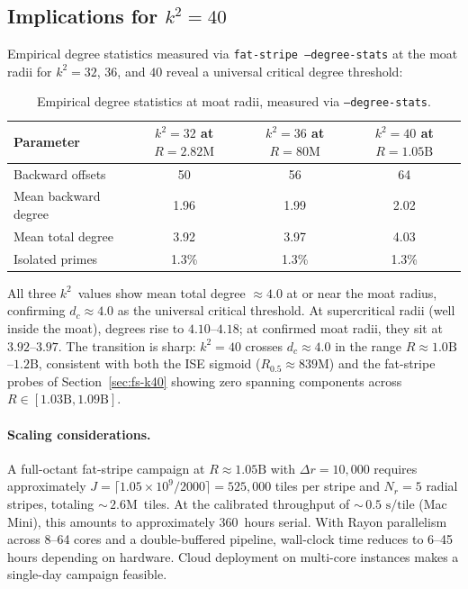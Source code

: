\documentclass[11pt,a4paper]{article}
\newcommand{\Rhalf}{R_{0.5}}
\theoremstyle{definition}
\theoremstyle{plain}
\theoremstyle{remark}
\begin{document}
\subsection{Implications for \texorpdfstring{$k^2 = 40$}{k\texttwosuperior\ = 40}}\label{sec:fs-k40-implications}

Empirical degree statistics measured via \texttt{fat-stripe --degree-stats} at the moat radii for $k^2 = 32$, $36$, and $40$ reveal a universal critical degree threshold:

\begin{table}[ht]
\centering
\begin{tabular}{@{}lccc@{}}
\toprule
Parameter & $k^2 = 32$ at $R = 2.82\text{M}$ & $k^2 = 36$ at $R = 80\text{M}$ & $k^2 = 40$ at $R = 1.05\text{B}$ \\
\midrule
Backward offsets            & 50   & 56   & 64   \\
Mean backward degree        & 1.96 & 1.99 & 2.02 \\
Mean total degree           & 3.92 & 3.97 & 4.03 \\
Isolated primes             & 1.3\% & 1.3\% & 1.3\% \\
\bottomrule
\end{tabular}
\caption{Empirical degree statistics at moat radii, measured via \texttt{--degree-stats}.}
\label{tab:k40-comparison}
\end{table}

All three $k^2$~values show mean total degree $\approx 4.0$ at or near the moat radius, confirming $d_c \approx 4.0$ as the universal critical threshold.  At supercritical radii (well inside the moat), degrees rise to $4.10$--$4.18$; at confirmed moat radii, they sit at $3.92$--$3.97$.  The transition is sharp: $k^2 = 40$ crosses $d_c \approx 4.0$ in the range $R \approx 1.0\text{B}$--$1.2\text{B}$, consistent with both the ISE sigmoid ($\Rhalf \approx 839\text{M}$) and the fat-stripe probes of Section~\ref{sec:fs-k40} showing zero spanning components across $R \in [1.03\text{B}, 1.09\text{B}]$.

\paragraph{Scaling considerations.}
A full-octant fat-stripe campaign at $R \approx 1.05\text{B}$ with $\Delta r = 10{,}000$ requires approximately $J = \lceil 1.05 \times 10^9 / 2000 \rceil = 525{,}000$ tiles per stripe and $N_r = 5$ radial stripes, totaling ${\sim}\,2.6\text{M}$~tiles.  At the calibrated throughput of ${\sim}\,0.5\text{ s/tile}$ (Mac Mini), this amounts to approximately $360$~hours serial.  With Rayon parallelism across 8--64 cores and a double-buffered pipeline, wall-clock time reduces to 6--45 hours depending on hardware.  Cloud deployment on multi-core instances makes a single-day campaign feasible.
\end{document}
